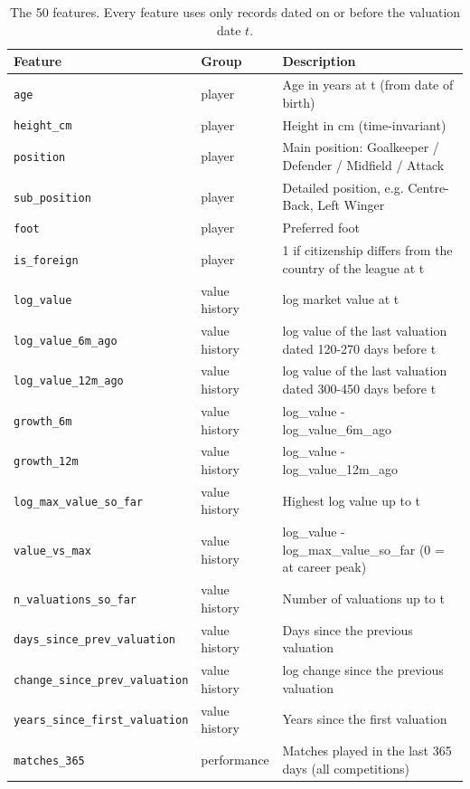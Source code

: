 \begin{table}[!h]
\centering
\caption{The 50 features. Every feature uses only records dated on or before the valuation date $t$.}
\label{tab:features}
\scriptsize
\begin{tabular}{llp{11.5cm}}
\toprule
Feature & Group & Description \\
\midrule
\texttt{age} & player & Age in years at t (from date of birth) \\
\texttt{height\_cm} & player & Height in cm (time-invariant) \\
\texttt{position} & player & Main position: Goalkeeper / Defender / Midfield / Attack \\
\texttt{sub\_position} & player & Detailed position, e.g. Centre-Back, Left Winger \\
\texttt{foot} & player & Preferred foot \\
\texttt{is\_foreign} & player & 1 if citizenship differs from the country of the league at t \\
\texttt{log\_value} & value history & log market value at t \\
\texttt{log\_value\_6m\_ago} & value history & log value of the last valuation dated 120-270 days before t \\
\texttt{log\_value\_12m\_ago} & value history & log value of the last valuation dated 300-450 days before t \\
\texttt{growth\_6m} & value history & log\_value - log\_value\_6m\_ago \\
\texttt{growth\_12m} & value history & log\_value - log\_value\_12m\_ago \\
\texttt{log\_max\_value\_so\_far} & value history & Highest log value up to t \\
\texttt{value\_vs\_max} & value history & log\_value - log\_max\_value\_so\_far (0 = at career peak) \\
\texttt{n\_valuations\_so\_far} & value history & Number of valuations up to t \\
\texttt{days\_since\_prev\_valuation} & value history & Days since the previous valuation \\
\texttt{change\_since\_prev\_valuation} & value history & log change since the previous valuation \\
\texttt{years\_since\_first\_valuation} & value history & Years since the first valuation \\
\texttt{matches\_365} & performance & Matches played in the last 365 days (all competitions) \\

\end{tabular}
\end{table}
